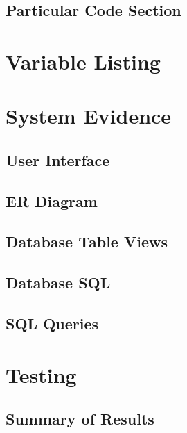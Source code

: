 \subsection{Particular Code Section}
\begin{comment}
\begin{figure}[H]
    \pythonfile[firstline=5,lastline=10]{./tex/function_programs/print_function.py}
    \caption{The print() function} \label{fig:print_function}
\end{figure}
\end{comment}

\section{Variable Listing}

\section{System Evidence}

\subsection{User Interface}

\subsection{ER Diagram}

\subsection{Database Table Views}

\subsection{Database SQL}

\subsection{SQL Queries}

\section{Testing}

\subsection{Summary of Results}

